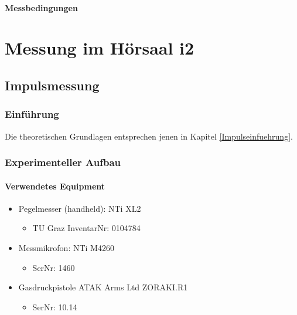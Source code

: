 \documentclass[11pt]{report}
\begin{document}
\paragraph{Messbedingungen}
\section{Messung im H\"orsaal i2}
\subsection{Impulsmessung}
\subsubsection{Einf\"uhrung}
Die theoretischen Grundlagen entsprechen jenen in Kapitel \ref{Impulseinfuehrung}.
\subsubsection{Experimenteller Aufbau}
\paragraph{Verwendetes Equipment}
\begin{itemize}
\item Pegelmesser (handheld): NTi XL2
\begin{itemize}
\item TU Graz InventarNr: 0104784
\end{itemize}
\item Messmikrofon: NTi M4260
\begin{itemize}
\item SerNr: 1460
\end{itemize}
\item Gasdruckpistole ATAK Arms Ltd ZORAKI.R1
\begin{itemize}
\item SerNr: 10.14
\end{itemize}
\end{itemize}
\end{document}
